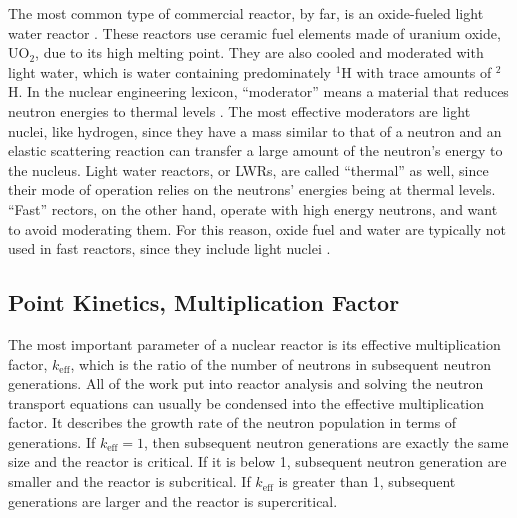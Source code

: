 The most common type of commercial reactor, by far, is an oxide-fueled light water reactor \cite{reactor_numbers}.   These reactors use ceramic fuel elements made of uranium oxide, UO$_2$, due to its high melting point.  They are also cooled and moderated with light water, which is water containing predominately $^1$H with trace amounts of $^2$H.  In the nuclear engineering lexicon, ``moderator'' means a material that reduces neutron energies to thermal levels \cite{duderstadt}.  The most effective moderators are light nuclei, like hydrogen, since they have a mass similar to that of a neutron and an elastic scattering reaction can transfer a large amount of the neutron's energy to the nucleus.  Light water reactors, or LWRs, are called ``thermal'' as well, since their mode of operation relies on the neutrons' energies being at thermal levels.  ``Fast'' rectors, on the other hand, operate with high energy neutrons, and want to avoid moderating them.  For this reason, oxide fuel and water are typically not used in fast reactors, since they include light nuclei \cite{duderstadt}.




\subsection{Point Kinetics, Multiplication Factor}

The most important parameter of a nuclear reactor is its effective multiplication factor, $k_\mathrm{eff}$, which is the ratio of the number of neutrons in subsequent neutron generations.  All of the work put into reactor analysis and solving the neutron transport equations can usually be condensed into the effective multiplication factor.  It describes the growth rate of the neutron population in terms of generations.  If $k_\mathrm{eff}=1$, then subsequent neutron generations are exactly the same size and the reactor is critical.  If it is below 1, subsequent neutron generation are smaller and the reactor is subcritical.  If $k_\mathrm{eff}$ is greater than 1, subsequent generations are larger and the reactor is supercritical.  

